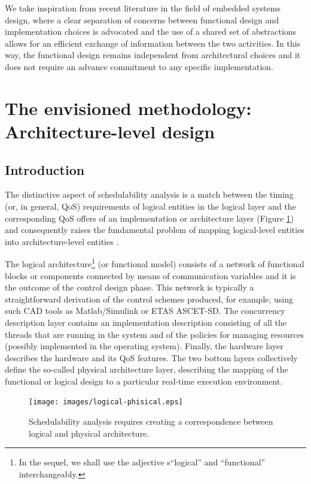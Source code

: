 We take inspiration from recent literature in the field of embedded
systems design, where a clear separation of concerns between
functional design and implementation choices is advocated and the use
of a shared set of abstractions allows for an efficient exchange of
information between the two activities. In this way, the functional
design remains independent from architectural choices and it does not
require an advance commitment to any specific implementation.


\section{The envisioned methodology: Architecture-level design}
\label{sec:envisioned-methodology}

\subsection{Introduction }

The distinctive aspect of schedulability analysis is a match between
the timing (or, in general, QoS) requirements of logical entities in
the logical layer and the corresponding QoS offers of an
implementation or architecture layer (Figure
\ref{fig:logical-phisical}) and consequently raises the fundamental
problem of mapping logical-level entities into architecture-level
entities \cite{OMG-PST02}.

The logical architecture\footnote{In the sequel, we shall use the
  adjective s{}``logical'' and {}``functional'' interchangeably.} (or
functional model) consists of a network of functional blocks or
components connected by means of communication variables and it is the
outcome of the control design phase. This network is typically a
straightforward derivation of the control schemes produced, for
example, using such CAD tools as Matlab/Simulink or ETAS ASCET-SD.
The concurrency description layer contains an implementation
description consisting of all the threads that are running in the
system and of the policies for managing resources (possibly
implemented in the operating system). Finally, the hardware layer
describes the hardware and its QoS features. The two bottom layers
collectively define the so-called physical architecture layer,
describing the mapping of the functional or logical design to a
particular real-time execution environment.

\begin{figure}
  \begin{center}
    \texttt{[image: images/logical-phisical.eps]}
  \end{center}
  \caption{Schedulability analysis requires creating a correspondence
    between logical and physical architecture.}
  \label{fig:logical-phisical}
\end{figure}


